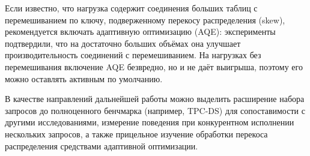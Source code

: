 \documentclass[12pt,letterpaper, onecolumn]{exam}
\begin{document}
Если известно, что нагрузка содержит соединения больших таблиц с перемешиванием
по ключу, подверженному перекосу распределения (skew), рекомендуется включать
адаптивную оптимизацию (AQE): эксперименты подтвердили, что на достаточно
больших объёмах она улучшает производительность соединений с перемешиванием. На
нагрузках без перемешивания включение AQE безвредно, но и не даёт выигрыша,
поэтому его можно оставлять активным по умолчанию.

В качестве направлений дальнейшей работы можно выделить расширение набора
запросов до полноценного бенчмарка (например, TPC-DS) для сопоставимости с
другими исследованиями, измерение поведения при конкурентном исполнении
нескольких запросов, а также прицельное изучение обработки перекоса
распределения средствами адаптивной оптимизации.
\end{document}
